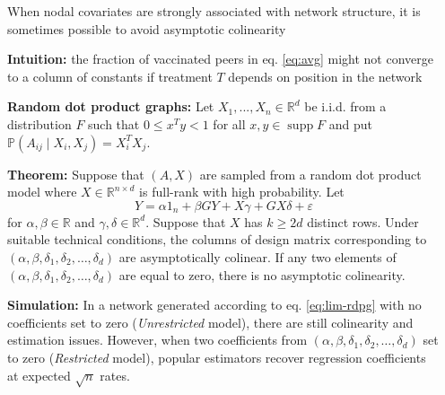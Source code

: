 \documentclass[final]{beamer}
\newcommand{\R}{\mathbb{R}}
\DeclareMathOperator*{\supp}{supp}
\newlength{\sepwidth}
\newlength{\colwidth}
\newcommand{\separatorcolumn}{\begin{column}{\sepwidth}\end{column}}
\begin{document}
\begin{frame}[t]
\begin{columns}[t]
        \separatorcolumn

        \begin{column}{\colwidth}
            \begin{block}{When nodal covariates are strongly associated with network structure, it is sometimes possible to avoid asymptotic colinearity}

                \textbf{Intuition:} the fraction of vaccinated peers in eq. \eqref{eq:avg} might not converge to a column of constants if treatment $T$ depends on position in the network

                \textbf{Random dot product graphs:} Let $X_1, ..., X_n \in \R^d$ be i.i.d. from a distribution $F$ such that $0 \le x^T y < 1$ for all $x,y \in \supp F$ and put $\mathbb{P}(A_{ij} \mid X_i, X_j) = X_i^T X_j$.

                \textbf{Theorem:} Suppose that $(A, X)$ are sampled from a random dot product model where $X \in \mathbb{R}^{n \times d}$ is full-rank with high probability. Let
                \begin{equation} \label{eq:lim-rdpg}
                    Y = \alpha 1_n + \beta G Y + X \gamma + G X \delta + \varepsilon
                \end{equation}
                for $\alpha, \beta \in \R$ and $\gamma, \delta \in \R^d$. Suppose that $X$ has $k \ge 2d$ distinct rows. Under suitable technical conditions, the columns of design matrix corresponding to $(\alpha, \beta, \delta_1, \delta_2, \dots, \delta_d)$ are asymptotically colinear. If any two elements of $(\alpha, \beta, \delta_1, \delta_2, \dots, \delta_d)$ are equal to zero, there is no asymptotic colinearity.

                \textbf{Simulation:} In a network generated according to eq. \eqref{eq:lim-rdpg} with no coefficients set to zero (\emph{Unrestricted} model), there are still colinearity and estimation issues. However, when two coefficients from $(\alpha, \beta, \delta_1, \delta_2, \dots, \delta_d)$ set to zero (\emph{Restricted} model), popular estimators recover regression coefficients at expected $\sqrt{n}$ rates.


\end{block}
\end{column}
\end{columns}
\end{frame}
\end{document}
